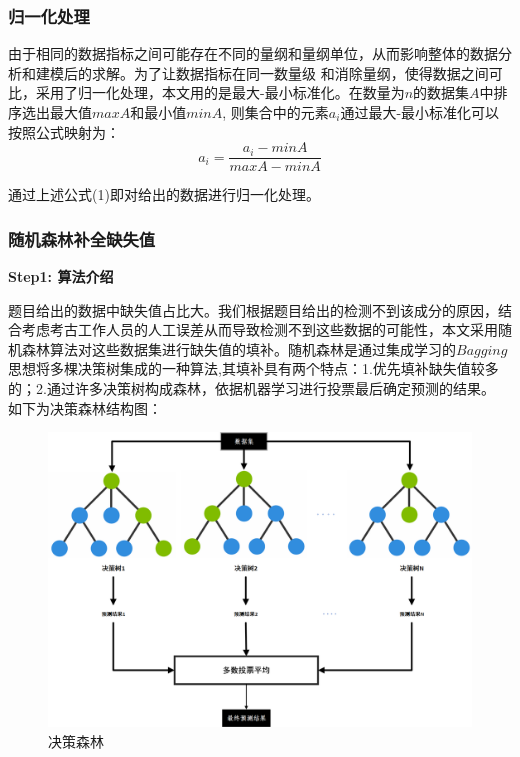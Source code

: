 \documentclass[UTF8]{ctexart}
\begin{document}
            \subsubsection{归一化处理}
            由于相同的数据指标之间可能存在不同的量纲和量纲单位，从而影响整体的数据分析和建模后的求解。为了让数据指标在同一数量级
            和消除量纲，使得数据之间可比，采用了归一化处理，本文用的是最大-最小标准化。在数量为$n$的数据集$A$中排序选出最大值$maxA$和最小值$minA$,
            则集合中的元素$a_i$通过最大-最小标准化可以按照公式映射为：
            \begin{equation}
                a_i = \frac{a_i-minA}{maxA-minA}
            \end{equation}


            通过上述公式(1)即对给出的数据进行归一化处理。
            \subsubsection{随机森林补全缺失值}
            \textbf{Step1: 算法介绍}

            题目给出的数据中缺失值占比大。我们根据题目给出的检测不到该成分的原因，结合考虑考古工作人员的人工误差从而导致检测不到这些数据的可能性，本文采用随机森林算法对这些数据集进行缺失值的填补。随机森林是通过集成学习的$Bagging$思想将多棵决策树集成的一种算法,其填补具有两个特点：1.优先填补缺失值较多的；2.通过许多决策树构成森林，依据机器学习进行投票最后确定预测的结果。
            如下为决策森林结构图：
            \begin{figure}[H]\centering
                \includegraphics[width=1\textwidth]{img/rf.png} %
                \caption{决策森林} %
                \label{fig:figure 1} %
            \end{figure}
\end{document}
